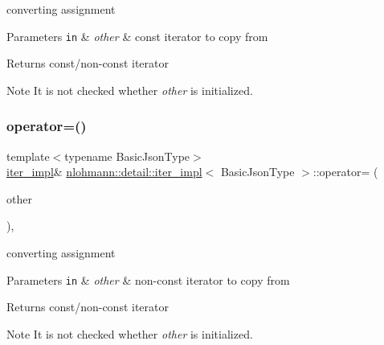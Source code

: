 converting assignment 


\begin{DoxyParams}[1]{Parameters}
\mbox{\tt in}  & {\em other} & const iterator to copy from \\
\hline
\end{DoxyParams}
\begin{DoxyReturn}{Returns}
const/non-\/const iterator 
\end{DoxyReturn}
\begin{DoxyNote}{Note}
It is not checked whether {\itshape other} is initialized. 
\end{DoxyNote}
\mbox{\label{classnlohmann_1_1detail_1_1iter__impl_a7159ed1cfe7c423a2baef8bea0c94509}} 
\subsubsection{\texorpdfstring{operator=()}{operator=()}\hspace{0.1cm}{\footnotesize\ttfamily [2/2]}}
{\footnotesize\ttfamily template$<$typename Basic\+Json\+Type$>$ \\
\mbox{\hyperlink{classnlohmann_1_1detail_1_1iter__impl}{iter\+\_\+impl}}\& \mbox{\hyperlink{classnlohmann_1_1detail_1_1iter__impl}{nlohmann\+::detail\+::iter\+\_\+impl}}$<$ Basic\+Json\+Type $>$\+::operator= (\begin{DoxyParamCaption}\item[{const \mbox{\hyperlink{classnlohmann_1_1detail_1_1iter__impl}{iter\+\_\+impl}}$<$ typename std\+::remove\+\_\+const$<$ Basic\+Json\+Type $>$\+::type $>$ \&}]{other }\end{DoxyParamCaption})\hspace{0.3cm}{\ttfamily [inline]}, {\ttfamily [noexcept]}}



converting assignment 


\begin{DoxyParams}[1]{Parameters}
\mbox{\tt in}  & {\em other} & non-\/const iterator to copy from \\
\hline
\end{DoxyParams}
\begin{DoxyReturn}{Returns}
const/non-\/const iterator 
\end{DoxyReturn}
\begin{DoxyNote}{Note}
It is not checked whether {\itshape other} is initialized. 
\end{DoxyNote}
\mbox{\label{classnlohmann_1_1detail_1_1iter__impl_a2b592605b63ae7f5401996ffa3b14393}} 
